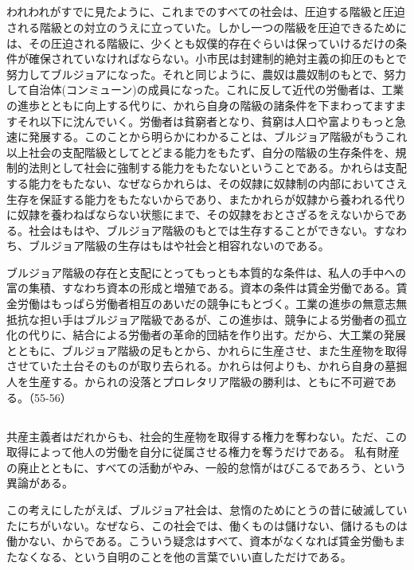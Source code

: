 \subsection{}


われわれがすでに見たように、これまでのすべての社会は、圧迫する階級と圧迫される階級との対立のうえに立っていた。しかし一つの階級を圧迫できるためには、その圧迫される階級に、少くとも奴僕的存在ぐらいは保っていけるだけの条件が確保されていなければならない。小市民は封建制的絶対主義の抑圧のもとで努力してブルジョアになった。それと同じように、農奴は農奴制のもとで、努力して自治体(コンミューン)の成員になった。これに反して近代の労働者は、工業の進歩とともに向上する代りに、かれら自身の階級の諸条件を下まわってますますそれ以下に沈んでいく。労働者は貧窮者となり、貧窮は人口や富よりもっと急速に発展する。このことから明らかにわかることは、ブルジョア階級がもうこれ以上社会の支配階級としてとどまる能力をもたず、自分の階級の生存条件を、規制的法則として社会に強制する能力をもたないということである。かれらは支配する能力をもたない、なぜならかれらは、その奴隷に奴隷制の内部においてさえ生存を保証する能力をもたないからであり、またかれらが奴隷から養われる代りに奴隷を養わねばならない状態にまで、その奴隷をおとさざるをえないからである。社会はもはや、ブルジョア階級のもとでは生存することができない。すなわち、ブルジョア階級の生存はもはや社会と相容れないのである。

ブルジョア階級の存在と支配にとってもっとも本質的な条件は、私人の手中への富の集積、すなわち資本の形成と増殖である。資本の条件は賃金労働である。賃金労働はもっぱら労働者相互のあいだの競争にもとづく。工業の進歩の無意志無抵抗な担い手はブルジョア階級であるが、この進歩は、競争による労働者の孤立化の代りに、結合による労働者の革命的団結を作り出す。だから、大工業の発展とともに、ブルジョア階級の足もとから、かれらに生産させ、また生産物を取得させていた土台そのものが取り去られる。かれらは何よりも、かれら自身の墓掘人を生産する。かられの没落とプロレタリア階級の勝利は、ともに不可避である。（55-56）


\subsection{}


共産主義者はだれからも、社会的生産物を取得する権力を奪わない。ただ、この取得によって他人の労働を自分に従属させる権力を奪うだけである。
私有財産の廃止とともに、すべての活動がやみ、一般的怠惰がはびこるであろう、という異論がある。

この考えにしたがえば、ブルジョア社会は、怠惰のためにとうの昔に破滅していたにちがいない。なぜなら、この社会では、働くものは儲けない、儲けるものは働かない、からである。こういう疑念はすべて、資本がなくなれば賃金労働もまたなくなる、という自明のことを他の言葉でいい直しただけである。

